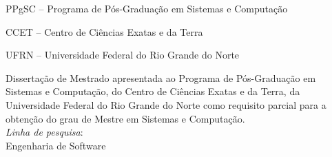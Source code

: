 
\titulo{\Large{\mscThesisTitle}}
\autor{\author}
\orientador[Orientador]{\par \advisor}

\ifcoadvisor
\coorientador[Coorientador]{\par \coadvisor}
\fi

\instituicao
{
	PPgSC -- Programa de Pós-Graduação em Sistemas e Computação\par 
   CCET -- Centro de Ciências Exatas e da Terra\par
   UFRN -- Universidade Federal do Rio Grande do Norte
}
	
\comentario
{
	Dissertação de Mestrado apresentada ao Programa de Pós-Graduação em Sistemas e Computação, do Centro de Ciências Exatas e da Terra, da Universidade Federal do Rio Grande do Norte como requisito parcial para a obtenção do grau de Mestre em Sistemas e Computação.\bigskip\\
   \textit{Linha de pesquisa}:\\Engenharia de Software
}
		
\local{\city}
\data{\date}
	
\folhaderosto
